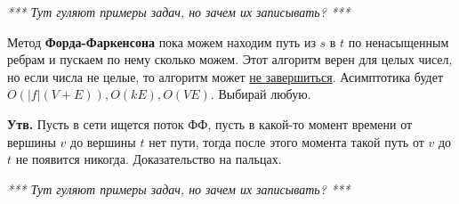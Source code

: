   \textit{*** Тут гуляют примеры задач, но зачем их записывать? ***}

  Метод \textbf{Форда-Фаркенсона} пока можем находим путь из $s$ в $t$ по ненасыщенным ребрам и пускаем по нему сколько можем. Этот алгоритм верен для целых чисел, но если числа не целые, то алгоритм может \href{https://ru.wikipedia.org/wiki/%D0%90%D0%BB%D0%B3%D0%BE%D1%80%D0%B8%D1%82%D0%BC_%D0%A4%D0%BE%D1%80%D0%B4%D0%B0_%E2%80%94_%D0%A4%D0%B0%D0%BB%D0%BA%D0%B5%D1%80%D1%81%D0%BE%D0%BD%D0%B0#%D0%9F%D1%80%D0%B8%D0%BC%D0%B5%D1%80_%D0%BD%D0%B5_%D1%81%D1%85%D0%BE%D0%B4%D1%8F%D1%89%D0%B5%D0%B3%D0%BE%D1%81%D1%8F_%D0%B0%D0%BB%D0%B3%D0%BE%D1%80%D0%B8%D1%82%D0%BC%D0%B0}{не завершиться}.
  Асимптотика будет $O(|f|(V+E)), O(kE), O(VE)$. Выбирай любую.

  \textbf{Утв.} Пусть в сети ищется поток ФФ, пусть в какой-то момент времени от вершины $v$ до вершины $t$ нет пути, тогда после этого момента такой путь от $v$ до $t$ не появится никогда. Доказательство на пальцах. 

  \textit{*** Тут гуляют примеры задач, но зачем их записывать? ***}
